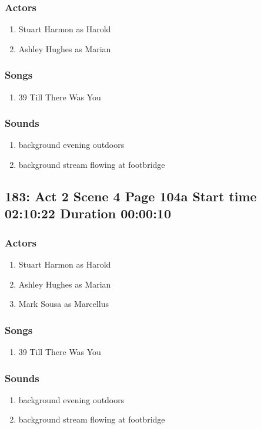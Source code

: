 \subsubsection{Actors}
\begin{enumerate}
\item Stuart Harmon as Harold
\item Ashley Hughes as Marian
\end{enumerate}

\subsubsection{Songs}
\begin{enumerate}
\item 39 Till There Was You
\end{enumerate}\subsubsection{Sounds}
\begin{enumerate}
\item background evening outdoors
\item background stream flowing at footbridge
\end{enumerate}
\subsection{183: Act 2 Scene 4 Page 104a Start time 02:10:22 Duration 00:00:10}

\subsubsection{Actors}
\begin{enumerate}
\item Stuart Harmon as Harold
\item Ashley Hughes as Marian
\item Mark Sousa as Marcellus
\end{enumerate}

\subsubsection{Songs}
\begin{enumerate}
\item 39 Till There Was You
\end{enumerate}\subsubsection{Sounds}
\begin{enumerate}
\item background evening outdoors
\item background stream flowing at footbridge
\end{enumerate}
